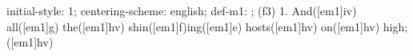 initial-style: 1;
centering-scheme: english;
def-m1: \grealign;
(f3) 1. And([em1]iv) all([em1]g) the([em1]hv) shin([em1]f)ing([em1]e) hosts([em1]hv) on([em1]hv) high;([em1]hv)